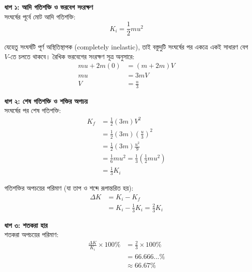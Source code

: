 \documentclass[12pt, a4paper]{article}
\begin{document}
\begin{tcolorbox}[solutionbox={সমাধান (Solution)}]
    \noindent
    \textbf{ধাপ ১: আদি গতিশক্তি ও ভরবেগ সংরক্ষণ} \\
    সংঘর্ষের পূর্বে মোট আদি গতিশক্তি:
    \[ K_i = \frac{1}{2} m u^2 \]
    
    যেহেতু সংঘর্ষটি পূর্ণ অস্থিতিস্থাপক (completely inelastic), তাই বস্তুদুটি সংঘর্ষের পর একত্রে একই সাধারণ বেগ $V$-তে চলতে থাকবে। রৈখিক ভরবেগের সংরক্ষণ সূত্র অনুসারে:
    \begin{align*}
        m u + 2m (0) &= (m + 2m) V \\
        m u &= 3m V \\
        V &= \frac{u}{3}
    \end{align*}
    
    \vspace{0.5em}
    \noindent\textbf{ধাপ ২: শেষ গতিশক্তি ও শক্তির অপচয়} \\
    সংঘর্ষের পর শেষ গতিশক্তি:
    \begin{align*}
        K_f &= \frac{1}{2} (3m) V^2 \\
            &= \frac{1}{2} (3m) \left(\frac{u}{3}\right)^2 \\
            &= \frac{1}{2} (3m) \frac{u^2}{9} \\
            &= \frac{1}{6} m u^2 = \frac{1}{3} \left(\frac{1}{2} m u^2\right) \\
            &= \frac{1}{3} K_i
    \end{align*}
    
    গতিশক্তির অপচয়ের পরিমাণ (যা তাপ ও শব্দে রূপান্তরিত হয়):
    \begin{align*}
        \Delta K &= K_i - K_f \\
                 &= K_i - \frac{1}{3} K_i = \frac{2}{3} K_i
    \end{align*}
    
    \vspace{0.5em}
    \noindent\textbf{ধাপ ৩: শতকরা হার} \\
    শতকরা অপচয়ের পরিমাণ:
    \begin{align*}
        \frac{\Delta K}{K_i} \times 100\% &= \frac{2}{3} \times 100\% \\
        &= 66.666...\% \\
        &\approx \mathbf{66.67\%}
    \end{align*}
\end{tcolorbox}
\end{document}
